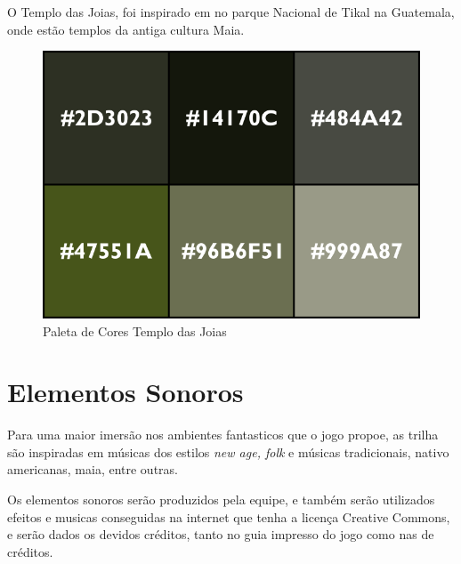 O Templo das Joias, foi inspirado em no parque Nacional de Tikal na Guatemala, onde estão templos da antiga cultura Maia.

\begin{figure}[htb]
	\caption{\label{fig_paletaTikal}Paleta de Cores Templo das Joias}
	\begin{center}
	    \includegraphics[width=\textwidth/2]{imagens/PaletaTikal.png}
	\end{center}
\end{figure}



\section{Elementos Sonoros}

Para uma maior imersão nos ambientes fantasticos que o jogo propoe, as trilha são inspiradas em músicas dos estilos \textit{new age, folk} e músicas tradicionais, nativo americanas, maia, entre outras.

Os elementos sonoros serão produzidos pela equipe, e também serão utilizados efeitos e musicas conseguidas na internet que tenha a licença Creative Commons, e serão dados os devidos créditos, tanto no guia impresso do jogo como nas de créditos.
